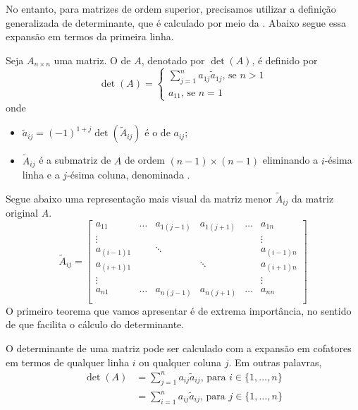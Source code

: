 \documentclass[../main.tex]{subfiles}
\begin{document}
			No entanto, para matrizes de ordem superior, precisamos utilizar a definição generalizada de determinante, que é calculado por meio da . Abaixo segue essa expansão em termos da primeira linha.
			\begin{definicao}
				Seja $A_{n\times n}$ uma matriz. O  de $A$, denotado por $\det(A)$, é definido por
				\[
				\det(A)=\begin{cases}\sum_{j=1}^{n} a_{1j}\tilde{a}_{1j}\text{, se } n>1\\
					a_{11}\text{, se } n=1
				\end{cases}
				\]
				onde
				\begin{itemize}
					\item $\tilde{a}_{ij}=(-1)^{1+j}\det(\tilde{A}_{ij})$ é o  de $a_{ij}$;
					\item $\tilde{A}_{ij}$ é a submatriz de $A$ de ordem $(n-1)\times (n-1)$ eliminando a $i$-ésima linha e a $j$-ésima coluna, denominada .
				\end{itemize} 
			\end{definicao}
			Segue abaixo uma representação mais visual da matriz menor $\tilde{A}_{ij}$ da matriz original $A$.
			\[
			\tilde{A}_{ij}=\begin{bmatrix}
				a_{11} & \dots & a_{1(j-1)} & a_{1(j+1)} & \dots & a_{1n} \\
				\vdots & \,    & \,         & \,         & \, & \vdots \\
				a_{(i-1)1} & \,& \ddots     & \,         & \, & a_{(i-1)n} 		\\
				a_{(i+1)1} & \,& \,         & \ddots     & \, & a_{(i+1)n} 		\\
				\vdots & \,    & \,         & \,         & \, & \vdots \\
				a_{n1} & \dots & a_{n(j-1)} & a_{n(j+1)} & \dots & a_{nn} \\
			\end{bmatrix}
			\]
			O primeiro teorema que vamos apresentar é de extrema importância, no sentido de que facilita o cálculo do determinante.
			\begin{teorema}
				O determinante de uma matriz pode ser calculado com a expansão em cofatores em termos de qualquer linha $i$ ou qualquer coluna $j$. Em outras palavras,
				\begin{align*}
					\det(A)
					&=\sum_{j=1}^{n} a_{ij}\tilde{a}_{ij}\text{, para } 	i\in \{1,\dots,n\}\\
					&=\sum_{i=1}^{n} a_{ij}\tilde{a}_{ij}\text{, para } j\in \{1,\dots, n\}
				\end{align*}
			\end{teorema}
\end{document}
